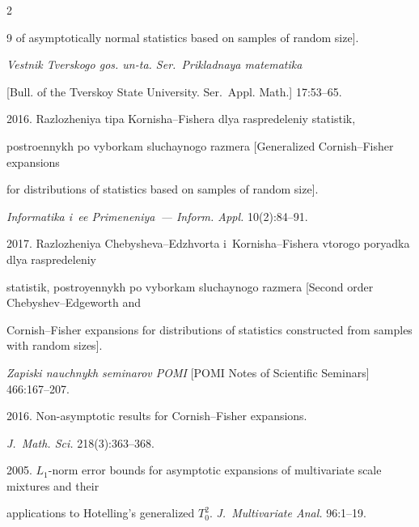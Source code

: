 \begin{multicols}{2}
{{\begin{thebibliography}{9}
 of asymptotically normal statistics based on samples of random size]. 


 \textit{Vestnik Tverskogo gos. un-ta. Ser.\ Prikladnaya matematika} 


 [Bull. of the Tverskoy State University. Ser.\ Appl. Math.] 17:53--65.






 2016. Razlozheniya tipa Kornisha--Fishera dlya raspredeleniy statistik, 


 postroennykh po vyborkam sluchaynogo razmera [Generalized Cornish--Fisher expansions 


 for distributions of statistics based on samples of random size]. 


  \textit{Informatika i~ee Primeneniya~--- Inform. Appl.} 10(2):84--91.






 2017. Razlozheniya Chebysheva--Edzhvorta i~Kornisha--Fishera vtorogo poryadka dlya raspredeleniy 


 statistik, postroyennykh po vyborkam sluchaynogo razmera [Second order Chebyshev--Edgeworth and 


 Cornish--Fisher expansions for distributions of statistics constructed from samples with random sizes]. 


  \textit{Zapiski nauchnykh seminarov POMI} [POMI Notes of Scientific Seminars] 466:167--207.


  {


  


  }






 2016. Non-asymptotic results for Cornish--Fisher expansions. 


 \textit{J.~Math. Sci.} 218(3):363--368.






 2005. $L_1$-norm error bounds for asymptotic expansions of multivariate scale mixtures and their 


 applications to Hotelling's generalized $T_0^2$.  \textit{J.~Multivariate Anal.} 96:1--19.






\end{thebibliography}}}
\end{multicols}
